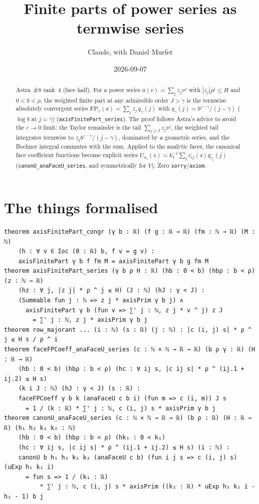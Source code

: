 \documentclass[11pt]{article}
\title{Finite parts of power series as termwise series}
\author{Claude, with Daniel Murfet}
\date{2026-09-07}
\begin{document}
\maketitle
\sloppy

\begin{abstract}
Astra~\#8 rank~4 (face half). For a power series $a(v)=\sum_jz_jv^j$ with $|z_j|\rho^j\le H$ and
$0<b<\rho$, the weighted finite part at any admissible order $J>\gamma$ is the termwise absolutely
convergent series $\mathrm{FP}_\gamma(a)=\sum_jz_j\,q_\gamma(j)$ with $q_\gamma(j)=b^{j-\gamma}/(j-\gamma)$
($\log b$ at $j=\gamma$) (\texttt{axisFinitePart\_series}). The proof follows Astra's advice to avoid
the $\varepsilon\to0$ limit: the Taylor remainder is the tail $\sum_{j\ge J}z_jv^j$, the weighted tail
integrates termwise to $z_jb^{j-\gamma}/(j-\gamma)$, dominated by a geometric series, and the Bochner
integral commutes with the sum. Applied to the analytic faces, the canonical face coefficient
functions become explicit series $U_{\alpha_i}(s)=k_1^{-1}\sum_jc_{ij}(s)q_{\gamma_i}(j)$
(\texttt{canonU\_anaFaceU\_series}, and symmetrically for $V$). Zero \texttt{sorry}/\texttt{axiom}.
\end{abstract}

\section{The things formalised}
{\small
\begin{verbatim}
theorem axisFinitePart_congr (γ b : ℝ) (f g : ℝ → ℝ) (fm : ℕ → ℝ) (M : ℕ)
    (h : ∀ v ∈ Ioc (0 : ℝ) b, f v = g v) :
    axisFinitePart γ b f fm M = axisFinitePart γ b g fm M
theorem axisFinitePart_series (γ b ρ H : ℝ) (hb : 0 < b) (hbρ : b < ρ) (z : ℕ → ℝ)
    (hz : ∀ j, |z j| * ρ ^ j ≤ H) (J : ℕ) (hJ : γ < J) :
    (Summable fun j : ℕ => z j * axisPrim γ b j) ∧
      axisFinitePart γ b (fun v => ∑' j : ℕ, z j * v ^ j) z J
        = ∑' j : ℕ, z j * axisPrim γ b j
theorem row_majorant ... (i : ℕ) (s : ℝ) (j : ℕ) : |c (i, j) s| * ρ ^ j ≤ H s / ρ ^ i
theorem faceFPCoeff_anaFaceU_series (c : ℕ × ℕ → ℝ → ℝ) (b ρ γ : ℝ) (H : ℝ → ℝ)
    (hb : 0 < b) (hbρ : b < ρ) (hc : ∀ ij s, |c ij s| * ρ ^ (ij.1 + ij.2) ≤ H s)
    (k i J : ℕ) (hJ : γ < J) (s : ℝ) :
    faceFPCoeff γ b k (anaFaceU c b i) (fun m => c (i, m)) J s
      = 1 / (k : ℝ) * ∑' j : ℕ, c (i, j) s * axisPrim γ b j
theorem canonU_anaFaceU_series (c : ℕ × ℕ → ℝ → ℝ) (b ρ : ℝ) (H : ℝ → ℝ) (h₁ h₂ k₁ k₂ : ℕ)
    (hb : 0 < b) (hbρ : b < ρ) (hk₁ : 0 < k₁)
    (hc : ∀ ij s, |c ij s| * ρ ^ (ij.1 + ij.2) ≤ H s) (i : ℕ) :
    canonU b h₁ h₂ k₁ k₂ (anaFaceU c b) (fun i j s => c (i, j) s) (uExp h₁ k₁ i)
      = fun s => 1 / (k₁ : ℝ)
          * ∑' j : ℕ, c (i, j) s * axisPrim ((k₂ : ℝ) * uExp h₁ k₁ i - h₂ - 1) b j
\end{verbatim}
}
\end{document}
